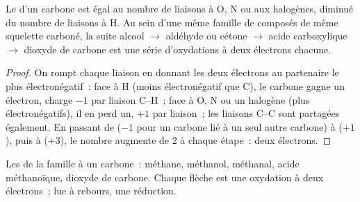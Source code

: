 \begin{proposition}\label{prop:b1:organic-redox:on-of-carbon}
Le  d'un carbone est égal au nombre de liaisons à O, N
ou aux halogènes, diminué du nombre de liaisons à H. Au sein d'une même
famille de composés de même squelette carboné, la suite alcool $\to$
aldéhyde ou cétone $\to$ acide carboxylique $\to$ dioxyde de carbone est
une série d'oxydations à deux électrons chacune.
\end{proposition}

\begin{proof}
On rompt chaque liaison en donnant les deux électrons au partenaire le
plus électronégatif~: face à H (moins électronégatif que C), le carbone
gagne un électron, charge $-1$ par liaison C--H~; face à O, N ou un
halogène (plus électronégatifs), il en perd un, $+1$ par liaison~; les
liaisons C--C sont partagées également. En passant de 
($-1$ pour un carbone lié à un seul autre carbone) à  ($+1$),
puis à
 ($+3$), le nombre augmente de 2 à chaque étape~: deux
électrons.
\end{proof}

\begin{omfigure}

{\small Les  de la famille à un carbone~: méthane,
méthanol, méthanal, acide méthanoïque, dioxyde de carbone. Chaque flèche
est une oxydation à deux électrons~; lue à rebours, une réduction.}
\end{omfigure}

